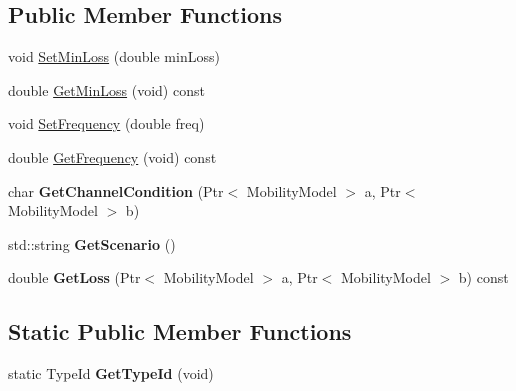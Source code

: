 \subsection*{Public Member Functions}
\begin{DoxyCompactItemize}
\item 
void \hyperlink{classns3_1_1millicar_1_1MmWaveVehicularPropagationLossModel_a25532b53a7b9552b09af5a083a17034f}{Set\+Min\+Loss} (double min\+Loss)
\item 
double \hyperlink{classns3_1_1millicar_1_1MmWaveVehicularPropagationLossModel_a1f9733beb4afa3cea41bb64d105c6d75}{Get\+Min\+Loss} (void) const
\item 
void \hyperlink{classns3_1_1millicar_1_1MmWaveVehicularPropagationLossModel_a893c89bb8594342511ef88e4acca3dfe}{Set\+Frequency} (double freq)
\item 
double \hyperlink{classns3_1_1millicar_1_1MmWaveVehicularPropagationLossModel_a4f36d3834b45b62a214acb976e2ae41a}{Get\+Frequency} (void) const
\item 
\mbox{\label{classns3_1_1millicar_1_1MmWaveVehicularPropagationLossModel_a980a03d5e0fc5885bbcdd235d4b88e9d}} 
char {\bfseries Get\+Channel\+Condition} (Ptr$<$ Mobility\+Model $>$ a, Ptr$<$ Mobility\+Model $>$ b)
\item 
\mbox{\label{classns3_1_1millicar_1_1MmWaveVehicularPropagationLossModel_acea3ba3d88275e90fbca748948956467}} 
std\+::string {\bfseries Get\+Scenario} ()
\item 
\mbox{\label{classns3_1_1millicar_1_1MmWaveVehicularPropagationLossModel_a4dc5e0633643b299cc2d855f8691ec64}} 
double {\bfseries Get\+Loss} (Ptr$<$ Mobility\+Model $>$ a, Ptr$<$ Mobility\+Model $>$ b) const
\end{DoxyCompactItemize}
\subsection*{Static Public Member Functions}
\begin{DoxyCompactItemize}
\item 
\mbox{\label{classns3_1_1millicar_1_1MmWaveVehicularPropagationLossModel_a1a05885ed5c37249cdf570ced2949a15}} 
static Type\+Id {\bfseries Get\+Type\+Id} (void)
\end{DoxyCompactItemize}


